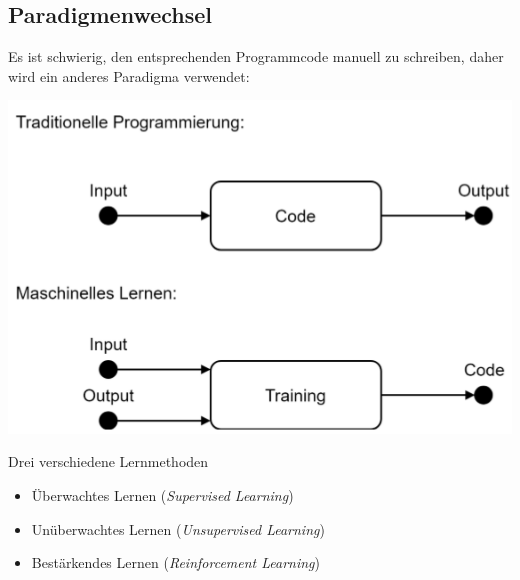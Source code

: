 \documentclass{report}
\begin{document}
  \subsection{Paradigmenwechsel}	
  Es ist schwierig, den entsprechenden Programmcode manuell zu schreiben, daher wird ein anderes Paradigma verwendet:	
  \begin{center}	
    \includegraphics[scale=.4]{ml01_2}	
  \end{center}	
  Drei verschiedene Lernmethoden	
  \begin{itemize}	
    \item Überwachtes Lernen (\textit{Supervised Learning})	
    \item Unüberwachtes Lernen (\textit{Unsupervised Learning})	
    \item Bestärkendes Lernen (\textit{Reinforcement Learning})	
  \end{itemize}	
  
\end{document}
